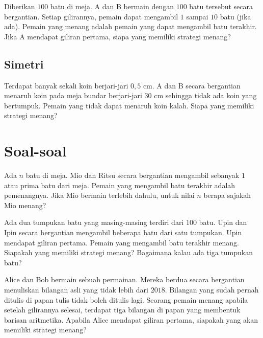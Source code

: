 \documentclass[11pt]{scrartcl}
\begin{document}
\begin{example}
Diberikan $100$ batu di meja. A dan B bermain dengan $100$ batu tersebut secara bergantian. Setiap gilirannya, pemain dapat mengambil $1$ sampai $10$ batu (jika ada). Pemain yang menang adalah pemain yang dapat mengambil batu terakhir. Jika A mendapat giliran pertama, siapa yang memiliki strategi menang?
\end{example}

\subsection{Simetri}
\begin{example}
Terdapat banyak sekali koin berjari-jari $0,5$ cm. A dan B secara bergantian menaruh koin pada meja bundar berjari-jari $30$ cm sehingga tidak ada koin yang bertumpuk. Pemain yang tidak dapat menaruh koin kalah. Siapa yang memiliki strategi menang?
\end{example}

\section{Soal-soal}
\begin{problem}
Ada $n$ batu di meja. Mio dan Ritsu secara bergantian mengambil sebanyak $1$ atau prima batu dari meja. Pemain yang mengambil batu terakhir adalah pemenangnya. Jika Mio bermain terlebih dahulu, untuk nilai $n$ berapa sajakah Mio menang?
\end{problem}

\begin{problem}
Ada dua tumpukan batu yang masing-masing terdiri dari $100$ batu. Upin dan Ipin secara bergantian mengambil beberapa batu dari satu tumpukan. Upin mendapat giliran pertama. Pemain yang mengambil batu terakhir menang. Siapakah yang memiliki strategi menang?
Bagaimana kalau ada tiga tumpukan batu?
\end{problem}

\begin{problem}
    [Auckland MO 2018] Alice dan Bob bermain sebuah permainan. Mereka berdua secara bergantian menuliskan bilangan asli yang tidak lebih dari $2018$. Bilangan yang sudah pernah ditulis di papan tulis tidak boleh ditulis lagi. Seorang pemain menang apabila setelah gilirannya selesai, terdapat tiga bilangan di papan yang membentuk barisan aritmetika. Apabila Alice mendapat giliran pertama, siapakah yang akan memiliki strategi menang? 
\end{problem}
\end{document}
